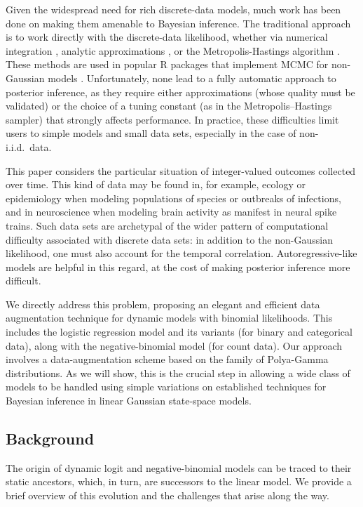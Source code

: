\documentclass[12pt]{article}
\newcounter{parnum}
\newcommand{\npoint}{%
  \noindent\refstepcounter{parnum}%
  \makebox[0.5in][c]{\textbf{\arabic{parnum}.}} %
  \marginnote{\small\ttfamily\the\inputlineno}}
\renewcommand{\npoint}{}
\begin{document}
Given the widespread need for rich discrete-data models, much work has been done
on making them amenable to Bayesian inference.  The traditional approach is to
work directly with the discrete-data likelihood, whether via numerical
integration \citep{skene:wakefield:1990}, analytic approximations
\citep{carlin:1992,bradlow:etal:2002,gelman:etal:2008,forster:2011}, or the
Metropolis-Hastings algorithm \citep{DelFor99,dobra:tebaldi:west:2006}.  These
methods are used in popular R packages that implement MCMC for non-Gaussian
models \citep{mcmcpack:2011}.  Unfortunately, none lead to a fully automatic
approach to posterior inference, as they require either approximations (whose
quality must be validated) or the choice of a tuning constant (as in the
Metropolis--Hastings sampler) that strongly affects performance.  In practice,
these difficulties limit users to simple models and small data sets, especially
in the case of non-i.i.d.~data.

This paper considers the particular situation of integer-valued outcomes
collected over time.  This kind of data may be found in, for example, ecology or
epidemiology when modeling populations of species or outbreaks of infections,
and in neuroscience when modeling brain activity as manifest in neural spike
trains.  Such data sets are archetypal of the wider pattern of computational
difficulty associated with discrete data sets: in addition to the non-Gaussian
likelihood, one must also account for the temporal correlation.
Autoregressive-like models are helpful in this regard, at the cost of making
posterior inference more difficult.

We directly address this problem, proposing an elegant and efficient data
augmentation technique for dynamic models with binomial likelihoods.  This
includes the logistic regression model and its variants (for binary and
categorical data), along with the negative-binomial model (for count data).  Our
approach involves a data-augmentation scheme based on the family of Polya-Gamma
distributions.  As we will show, this is the crucial step in allowing a wide
class of models to be handled using simple variations on established techniques
for Bayesian inference in linear Gaussian state-space models.

\subsection{Background}

\npoint The origin of dynamic logit and negative-binomial models can be traced
to their static ancestors, which, in turn, are successors to the linear model.
We provide a brief overview of this evolution and the challenges that arise
along the way.
\end{document}
